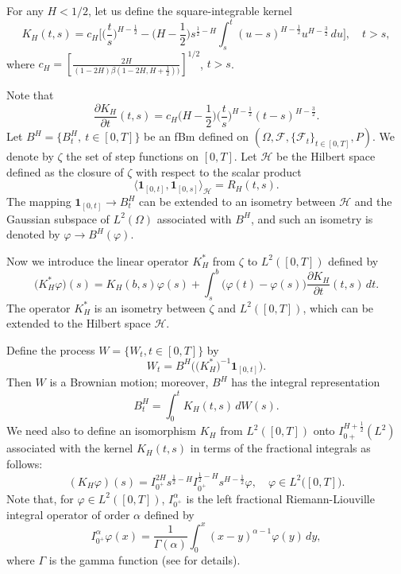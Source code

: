 \documentclass[numbers,compress,v1.0.1]{vmsta}
\theoremstyle{definition}
\begin{document}
For any $H<1/2$, let us define the square-integrable kernel
%
\begin{equation*}
K_{H}(t,s)=c_{H} \Biggl[ \biggl(\frac{t}{s}
\biggr)^{H-\frac{1}{2}}- \biggl(H-\frac{1}{2} \biggr)s^{\frac{1}{2}-H}\int
_{s}^{t}(u-s)^{H-\frac
{1}{2}}u^{H-\frac{3}{2}}\,du
\Biggr], \quad t>s,
\end{equation*}
%
where $c_{H}= [\frac{2H}{(1-2H)\beta(1-2H,H+\frac{1}{2}))}
]^{1/2}$, $t>s$.

Note that
%
\begin{equation*}
\frac{\partial K_{H}}{\partial t}(t,s)=c_{H} \biggl(H-\frac{1}{2} \biggr)
\biggl(\frac{t}{s} \biggr)^{H-\frac{1}{2}}(t-s)^{H-\frac{3}{2}}.
\end{equation*}
%
Let $B^{H}=\{B_{t}^{H}, \ t\in[0,T]\}$ be an fBm defined on $(\varOmega,
\mathcal{F}, \{\mathcal{F}_t\}_{t\in[0,T]}, P)$. We denote by $\zeta$
the set of step functions on $[0,T]$. Let $\mathcal{H}$ be the Hilbert
space defined as
the closure of $\zeta$ with respect to the scalar product
%
\begin{equation*}
\langle\textbf{1}_{[0,t]}, \textbf{1}_{[0,s]}\rangle_{\mathcal{H}}=R_{H}(t,s).
\end{equation*}
%
The mapping $\textbf{1}_{[0,t]}\rightarrow B_{t}^{H}$ can be extended
to an isometry between $\mathcal{H}$ and the Gaussian subspace of
$L^2({\varOmega})$ associated with $B^{H}$, and such an isometry is
denoted by $\varphi\rightarrow B^{H}(\varphi)$.

Now we introduce the linear operator $K_{H}^{*}$ from $\zeta$ to
$L^{2}([0,T])$ defined by
%
\begin{equation*}
\bigl(K_{H}^{*}\varphi\bigr) (s)=K_{H}(b,s)
\varphi(s)+\int_{s}^{b}\bigl(\varphi (t)-\varphi(s)
\bigr)\frac{\partial K_{H}}{\partial t}(t,s)\,dt.
\end{equation*}
%
The operator $K_{H}^{*}$ is an isometry between $\zeta$ and
$L^{2}([0,T])$, which can be extended to the Hilbert space $\mathcal
{H}$.

Define the process $W= \{W_{t},t\in[0,T]\}$ by
%
\begin{equation*}
W_{t}=B^{H}\bigl(\bigl(K_{H}^{\ast}
\bigr)^{-1}\textbf{1}_{[0,t]}\bigr).
\end{equation*}
%
Then $W$ is a Brownian motion; moreover, $B^{H}$ has the integral representation
%
\begin{equation*}
B_t^{H}=\int_{0}^{t}K_{H}(t,s)\,dW(s).
\end{equation*}
%
We need also to define an isomorphism $K_H$ from $L^2([0,T])$ onto
$I_{0+}^{H+\frac{1}{2}}(L^2)$ associated with the kernel $K_H(t,s)$ in
terms of the fractional integrals as follows:
%
\[
(K_H \varphi) (s) = I_{0^+}^{2H} s^{\frac{1}{2}-H}
I_{0^+}^{\frac
{1}{2}-H}s^{H-\frac{1}{2}} \varphi, \quad\varphi\in
L^2\bigl([0,T]\bigr).
\]
%
Note that, for $\varphi\in L^2([0,T])$, $I_{0^+}^{\alpha}$ is the left
fractional Riemann-Liouville integral operator of order $\alpha$
defined by
%
\[
I_{0^+}^\alpha\varphi(x) = \frac{1}{\varGamma(\alpha)} \int
_0^x (x-y)^{\alpha-1}\varphi(y)\,dy,
\]
%
where $\varGamma$ is the gamma function (see \cite{DU} for details).
\end{document}
